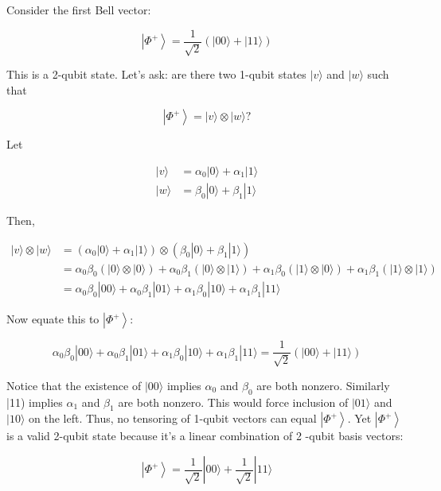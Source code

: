 \documentclass[main.tex]{subfiles}
\begin{document}
    Consider the first Bell vector:
    
    $$
    \left|\Phi^{+}\right\rangle=\frac{1}{\sqrt{2}}(|00\rangle+|11\rangle)
    $$
    
    This is a 2-qubit state. Let's ask: are there two 1-qubit states $|v\rangle$ and $|w\rangle$ such that
    
    $$
    \left|\Phi^{+}\right\rangle=|v\rangle \otimes|w\rangle ?
    $$
    
    Let
    
    $$
    \begin{aligned}
    |v\rangle &=\alpha_{0}|0\rangle+\alpha_{1}|1\rangle \\
    |w\rangle &=\beta_{0}|0\rangle+\beta_{1}|1\rangle
    \end{aligned}
    $$
    
    Then,
    
    $$
    \begin{aligned}
    |v\rangle \otimes|w\rangle &=\left(\alpha_{0}|0\rangle+\alpha_{1}|1\rangle\right) \otimes\left(\beta_{0}|0\rangle+\beta_{1}|1\rangle\right) \\
    &=\alpha_{0} \beta_{0}(|0\rangle \otimes|0\rangle)+\alpha_{0} \beta_{1}(|0\rangle \otimes|1\rangle)+\alpha_{1} \beta_{0}(|1\rangle \otimes|0\rangle)+\alpha_{1} \beta_{1}(|1\rangle \otimes|1\rangle) \\
    &=\alpha_{0} \beta_{0}|00\rangle+\alpha_{0} \beta_{1}|01\rangle+\alpha_{1} \beta_{0}|10\rangle+\alpha_{1} \beta_{1}|11\rangle
    \end{aligned}
    $$
    
    Now equate this to $\left|\Phi^{+}\right\rangle$:
    
    $$
    \alpha_{0} \beta_{0}|00\rangle+\alpha_{0} \beta_{1}|01\rangle+\alpha_{1} \beta_{0}|10\rangle+\alpha_{1} \beta_{1}|11\rangle=\frac{1}{\sqrt{2}}(|00\rangle+|11\rangle)
    $$
    
    Notice that the existence of $|00\rangle$ implies $\alpha_{0}$ and $\beta_{0}$ are both nonzero. Similarly |11) implies $\alpha_{1}$ and $\beta_{1}$ are both nonzero. This would force inclusion of $|01\rangle$ and $|10\rangle$ on the left. Thus, no tensoring of 1-qubit vectors can equal $\left|\Phi^{+}\right\rangle$. Yet $\left|\Phi^{+}\right\rangle$is a valid 2-qubit state because it's a linear combination of 2 -qubit basis vectors:
    
    $$
    \left|\Phi^{+}\right\rangle=\frac{1}{\sqrt{2}}|00\rangle+\frac{1}{\sqrt{2}}|11\rangle
    $$
    
\end{document}
